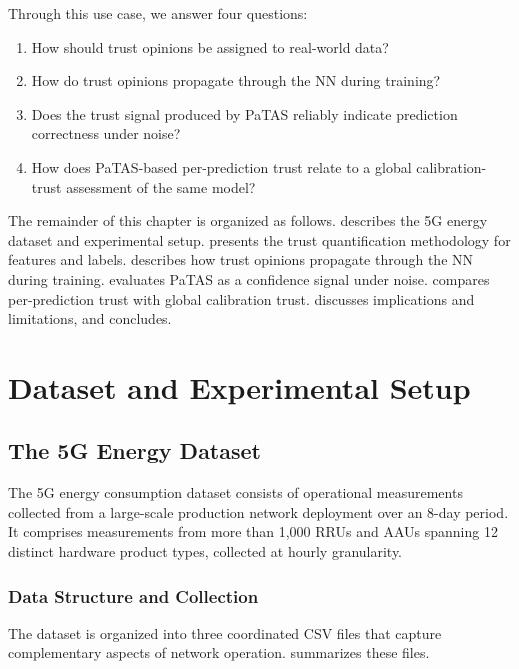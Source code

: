 Through this use case, we answer four questions:
\begin{enumerate}
    \item How should trust opinions be assigned to real-world data?
    \item How do trust opinions propagate through the \ac{NN} during training?
    \item Does the trust signal produced by \ac{PaTAS} reliably indicate prediction correctness under noise?
    \item How does \ac{PaTAS}-based per-prediction trust relate to a global calibration-trust assessment of the same model?
\end{enumerate}

The remainder of this chapter is organized as follows.  describes the 5G energy dataset and experimental setup.  presents the trust quantification methodology for features and labels.  describes how trust opinions propagate through the \ac{NN} during training.  evaluates PaTAS as a confidence signal under noise.   compares per-prediction trust with global calibration trust.  discusses implications and limitations, and  concludes.


\section{Dataset and Experimental Setup}
\label{sec:dataset}
\subsection{The 5G Energy Dataset}
\label{sec:5g_dataset}

The 5G energy consumption dataset consists of operational measurements collected from a large-scale production network deployment over an 8-day period. It comprises measurements from more than 1,000 \acp{RRU} and \acp{AAU} spanning 12 distinct hardware product types, collected at hourly granularity. 


\subsubsection{Data Structure and Collection}
\label{sec:data_structure}

The dataset is organized into three coordinated CSV files that capture complementary aspects of network operation.  summarizes these files.

